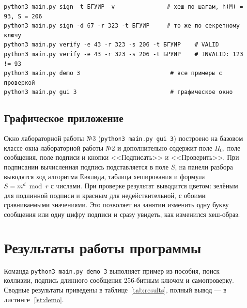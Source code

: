 \documentclass[14pt,a4paper]{extarticle}
\begin{document}
\begin{lstlisting}[style=shell, caption={Примеры запуска}, label={lst:cli}]
python3 main.py sign -t БГУИР -v               # хеш по шагам, h(M) = 93, S = 206
python3 main.py sign -d 67 -r 323 -t БГУИР     # то же по секретному ключу
python3 main.py verify -e 43 -r 323 -s 206 -t БГУИР    # VALID
python3 main.py verify -e 43 -r 323 -s 206 -t БРУИР    # INVALID: 123 != 93
python3 main.py demo 3                          # все примеры с проверкой
python3 main.py gui 3                           # графическое окно
\end{lstlisting}

\subsection{Графическое приложение}

Окно лабораторной работы №3 (\texttt{python3 main.py gui 3}) построено на базовом
классе окна лабораторной работы №2 и дополнительно содержит поле $H_0$, поле
сообщения, поле подписи и кнопки <<Подписать>> и <<Проверить>>. При подписании
вычисленная подпись подставляется в поле $S$, на панели разбора выводятся ход
алгоритма Евклида, таблица хеширования и формула $S = m^d \bmod r$ с числами. При
проверке результат выводится цветом: зелёным для подлинной подписи и красным для
недействительной, с обоими сравниваемыми значениями. Это позволяет на занятии
изменить одну букву сообщения или одну цифру подписи и сразу увидеть, как изменился
хеш-образ.

\section{Результаты работы программы}

Команда \texttt{python3 main.py demo 3} выполняет пример из пособия, поиск коллизии,
подпись длинного сообщения 256-битным ключом и самопроверку. Сводные результаты
приведены в таблице~\ref{tab:results}, полный вывод --- в листинге~\ref{lst:demo}.
\end{document}
